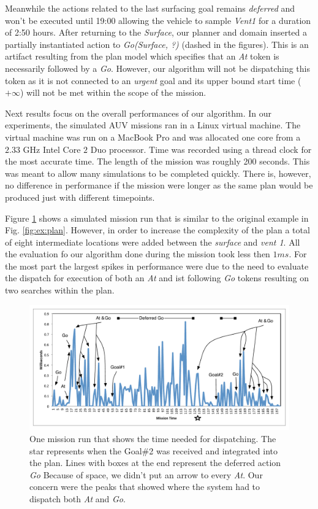 Meanwhile the actions related to the last surfacing goal remains {\em
  deferred} and won't be executed until 19:00 allowing the vehicle to
sample {\em Vent1} for a duration of 2:50 hours.  After returning to the {\em
  Surface}, our planner and domain inserted a  partially instantiated
action to {\em Go(Surface, ?)} (dashed in the figures). 
This is an artifact resulting from the plan model which specifies that 
an {\em At} token is necessarily followed by a {\em Go}.
However, our algorithm will not be dispatching this token as it is not
connected to an {\em urgent} goal and its upper bound 
start time ($+\infty$) will not be met within the scope of the
mission. 

Next results focus on the overall performances of our algorithm. In our
experiments, the simulated AUV missions ran in a Linux virtual
machine. The virtual machine was run on a MacBook Pro and was 
allocated one core from a $2.33$ GHz Intel Core $2$ Duo processor. 
Time was recorded using a thread clock for the most accurate time.
The length of the mission was roughly 200 seconds. This was meant to allow many
simulations to be completed quickly. There is, however, no difference in 
performance if the mission were longer as the same plan would be produced
just with different timepoints.
 
Figure \ref{fig:example_run} shows a simulated mission run that
is similar to the original example in Fig. \ref{fig:ex:plan}.
However, in order to increase the complexity of the plan a
total of eight intermediate locations were added between the {\em
  surface} and {\em vent 1}. All the evaluation fo our algorithm 
done during the mission took less then $1ms$. For the most part the
largest spikes in performance were due to the need to evaluate the
dispatch for execution of both an {\em At} and ist following {\em Go}
tokens resulting on two searches within the plan. 

\begin{figure}[b]
  \centering
  \includegraphics[width=\columnwidth]{figs/example_run.pdf}
  \caption{\small One mission run that shows the time needed for
    dispatching. The star represents when the Goal\#2 was received and
    integrated into the plan. Lines with boxes at the end represent
    the deferred action {\em Go} Because of space, we didn't put an
    arrow to every {\em At}. Our concern were the peaks that showed
    where the system had to dispatch both {\em At} and {\em Go}. }
  \label{fig:example_run}
\end{figure}

